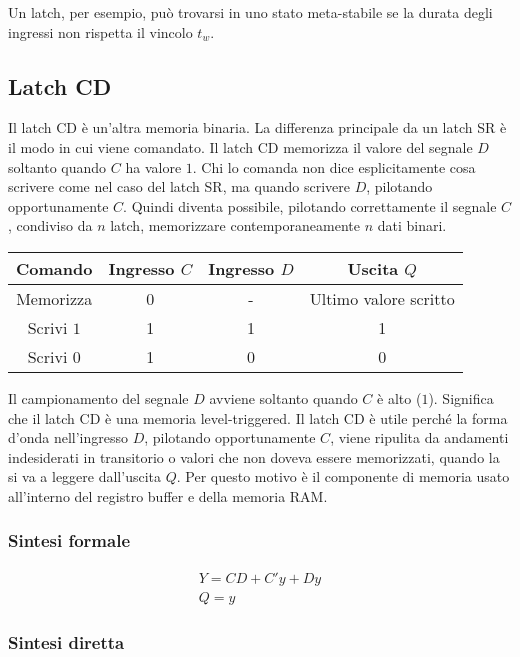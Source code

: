 \documentclass{article}
\begin{document}
\noindent
Un latch, per esempio, può trovarsi in uno stato meta-stabile se la durata degli ingressi non rispetta il vincolo $t_w$.

\subsection{Latch CD}

Il latch CD è un'altra memoria binaria.
La differenza principale da un latch SR è il modo in cui viene comandato.
Il latch CD memorizza il valore del segnale $D$ soltanto quando $C$ ha valore $1$.
Chi lo comanda non dice esplicitamente cosa scrivere come nel caso del latch SR, ma quando scrivere $D$, pilotando opportunamente $C$.
Quindi diventa possibile, pilotando correttamente il segnale $C$, condiviso da $n$ latch, memorizzare contemporaneamente $n$ dati binari.

\begin{center}
\begin{tabular}{ |c|c|c|c| }
\hline
Comando & Ingresso $C$ & Ingresso $D$ & Uscita $Q$  \\
\hline
\hline
Memorizza & 0 & - & Ultimo valore scritto \\
Scrivi $1$ & 1 & 1 & 1 \\
Scrivi $0$ & 1 & 0 & 0 \\
\hline
\end{tabular}
\end{center}

\noindent
Il campionamento del segnale $D$ avviene soltanto quando $C$ è alto ($1$).
Significa che il latch CD è una memoria level-triggered.
Il latch CD è utile perché la forma d'onda nell'ingresso $D$, pilotando opportunamente $C$, viene ripulita da andamenti indesiderati in transitorio o valori che non doveva essere memorizzati, quando la si va a leggere dall'uscita $Q$.
Per questo motivo è il componente di memoria usato all'interno del registro buffer e della memoria RAM.

\subsubsection{Sintesi formale}

$$
\begin{matrix}
Y=CD+C'y+Dy\\
Q=y
\end{matrix}
$$

\subsubsection{Sintesi diretta}
\end{document}
